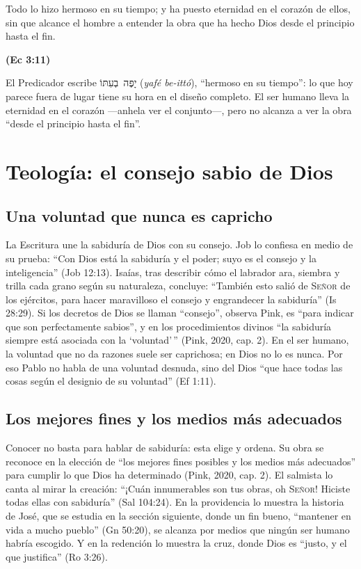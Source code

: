 \documentclass[11pt,letterpaper]{article}
\newcommand{\heb}[1]{\mbox{\foreignlanguage{hebrew}{#1}}}
\newcommand{\SENOR}{\textsc{Señor}}
\newcommand{\fuente}[1]{\par\hfill{\upshape\bfseries\small\textcolor{azul}{#1}}}
\begin{document}
\begin{cita}Todo lo hizo hermoso en su tiempo; y ha puesto eternidad en el corazón de ellos, sin que alcance el hombre a entender la obra que ha hecho Dios desde el principio hasta el fin.\fuente{(Ec 3:11)}\end{cita}

El Predicador escribe \heb{יָפֶה בְעִתּוֹ} (\emph{yafé be-ittó}), ``hermoso en su tiempo'': lo que hoy parece fuera de lugar tiene su hora en el diseño completo. El ser humano lleva la eternidad en el corazón ---anhela ver el conjunto---, pero no alcanza a ver la obra ``desde el principio hasta el fin''.

\section{Teología: el consejo sabio de Dios}

\subsection{Una voluntad que nunca es capricho}
La Escritura une la sabiduría de Dios con su consejo. Job lo confiesa en medio de su prueba: ``Con Dios está la sabiduría y el poder; suyo es el consejo y la inteligencia'' (Job 12:13). Isaías, tras describir cómo el labrador ara, siembra y trilla cada grano según su naturaleza, concluye: ``También esto salió de \SENOR{} de los ejércitos, para hacer maravilloso el consejo y engrandecer la sabiduría'' (Is 28:29). Si los decretos de Dios se llaman ``consejo'', observa Pink, es ``para indicar que son perfectamente sabios'', y en los procedimientos divinos ``la sabiduría siempre está asociada con la `voluntad'\,'' (Pink, 2020, cap. 2). En el ser humano, la voluntad que no da razones suele ser caprichosa; en Dios no lo es nunca. Por eso Pablo no habla de una voluntad desnuda, sino del Dios ``que hace todas las cosas según el designio de su voluntad'' (Ef 1:11).

\subsection{Los mejores fines y los medios más adecuados}
Conocer no basta para hablar de sabiduría: esta elige y ordena. Su obra se reconoce en la elección de ``los mejores fines posibles y los medios más adecuados'' para cumplir lo que Dios ha determinado (Pink, 2020, cap. 2). El salmista lo canta al mirar la creación: ``¡Cuán innumerables son tus obras, oh \SENOR{}! Hiciste todas ellas con sabiduría'' (Sal 104:24). En la providencia lo muestra la historia de José, que se estudia en la sección siguiente, donde un fin bueno, ``mantener en vida a mucho pueblo'' (Gn 50:20), se alcanza por medios que ningún ser humano habría escogido. Y en la redención lo muestra la cruz, donde Dios es ``justo, y el que justifica'' (Ro 3:26).
\end{document}
